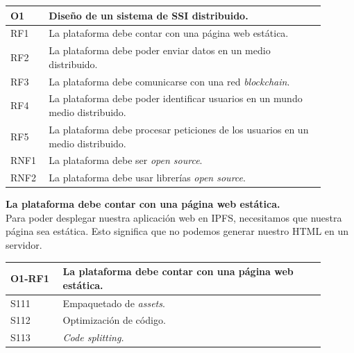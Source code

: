 \begin{center}
    \begin{table}[h!]
        \begin{tabular}{|p{0.1\linewidth} | p{0.8\linewidth}|}
            \hline
             
            \textbf{O1} & \textbf{Diseño de un sistema de SSI distribuido.} \\
            \hline
            RF1         & La plataforma debe contar con una página web estática. \\
            \hline
            RF2         & La plataforma debe poder enviar datos en un medio distribuido. \\
            \hline
            RF3         & La plataforma debe comunicarse con una red \textit{blockchain}. \\
            \hline
            RF4         & La plataforma debe poder identificar usuarios en un mundo medio distribuido. \\
            \hline
            RF5         & La plataforma debe procesar peticiones de los usuarios en un medio distribuido. \\
            \hline
            RNF1        & La plataforma debe ser \textit{open source}. \\
            \hline
            RNF2        & La plataforma debe usar librerías \textit{open source}. \\
            \hline
        \end{tabular}
    \end{table}
\end{center}
\textbf{La plataforma debe contar con una página web estática.}\\
Para poder desplegar nuestra aplicación web en IPFS, necesitamos que nuestra página sea estática. Esto significa que no podemos generar nuestro HTML en un servidor.
\begin{center}
    \begin{table}[h!]
        \begin{tabular}{|p{0.15\linewidth} | p{0.75\linewidth}|}
            \hline
             
            \textbf{O1-RF1} & \textbf{La plataforma debe contar con una página web estática.} \\
            \hline
            S111            & Empaquetado de \textit{assets}. \\
            \hline
            S112            & Optimización de código. \\
            \hline
            S113            & \textit{Code splitting.} \\
            \hline
        \end{tabular}
    \end{table}
\end{center}
